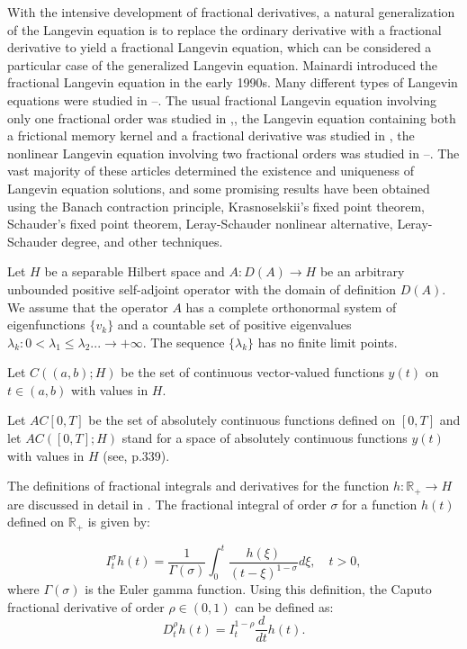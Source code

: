 \documentclass{amsart}
\numberwithin{equation}{section}
\begin{document}
With the intensive development of fractional derivatives, a natural generalization of the Langevin equation is to replace the ordinary derivative with a fractional derivative to yield a fractional Langevin equation, which can be considered a particular case of the generalized Langevin equation. Mainardi introduced the fractional Langevin equation \cite{Mainardi} in the early 1990s. Many different types of  Langevin equations were studied in \cite{Burov}–\cite{AhmadAlsaedi}. The usual fractional Langevin equation involving only one fractional order was studied in \cite{Lutz},\cite{Burov}, the Langevin equation containing both a frictional memory kernel and a fractional derivative was studied in \cite{Fa}, the nonlinear Langevin equation involving two fractional orders was studied in \cite{LimLi}–\cite{AhmadAlsaedi}. The vast majority of these articles determined the existence and uniqueness of Langevin equation solutions, and some promising results have been obtained using the Banach contraction principle, Krasnoselskii's fixed point theorem, Schauder's fixed point theorem, Leray-Schauder nonlinear alternative, Leray-Schauder degree, and other techniques.


Let $H$ be a separable Hilbert space and $A: D(A) \rightarrow H$ be an arbitrary unbounded positive self-adjoint operator with the domain of definition $D(A)$. We assume that the operator $A$ has a complete orthonormal system of eigenfunctions $\{v_k\}$ and a countable set of positive eigenvalues $\lambda_k:0<\lambda_1 \leq \lambda_2...\rightarrow +\infty$. The sequence $\{\lambda_k\}$ has no finite limit points.


Let $C((a,b); H)$   be the set of continuous vector-valued functions $y(t)$ on  $t\in (a,b)$ with values in $H$.

Let $AC[0, T]$ be the set of absolutely continuous functions defined on $[0, T]$ and let $AC([0, T]; H)$ stand for a space of absolutely continuous functions $y(t)$ with values in $H$ (see, \cite{Fomin} p.339).

The definitions of fractional integrals and derivatives for the function $h:\mathbb{R}_+ \rightarrow H$ are discussed in detail in \cite{Lizama}. The fractional integral of order $\sigma$ for a function $h(t)$ defined on $\mathbb{R}_+$ is given by:

$$
I_t^\sigma h(t)=\frac{1}{\Gamma(\sigma)} \int_0^t \frac{h(\xi)}{(t-\xi)^{1-\sigma}} d\xi, \quad t>0,
$$
where $\Gamma(\sigma)$ is the Euler gamma function. Using this definition, the Caputo fractional derivative of order $\rho \in (0,1)$ can be defined as:
$$
D_t^\rho h(t)=I_t^{1-\rho} \frac{d}{dt}h(t).
$$
\end{document}
